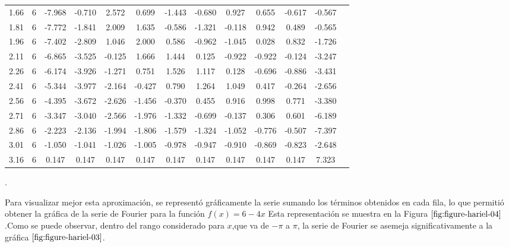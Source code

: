 {\begin{table}[H]
{\begin{tabular}{|c|cccccccccc|c|c|}
        1.66 & 6 & -7.968 & -0.710 & 2.572 & 0.699 & -1.443 & -0.680 & 0.927 & 0.655 & -0.617 & -0.567 \\ 
        1.81 & 6 & -7.772 & -1.841 & 2.009 & 1.635 & -0.586 & -1.321 & -0.118 & 0.942 & 0.489 & -0.565 \\ 
        1.96 & 6 & -7.402 & -2.809 & 1.046 & 2.000 & 0.586 & -0.962 & -1.045 & 0.028 & 0.832 & -1.726 \\
        2.11 & 6 & -6.865 & -3.525 & -0.125 & 1.666 & 1.444 & 0.125 & -0.922 & -0.922 & -0.124 & -3.247 \\
        2.26 & 6 & -6.174 & -3.926 & -1.271 & 0.751 & 1.526 & 1.117 & 0.128 & -0.696 & -0.886 & -3.431 \\ 
        2.41 & 6 & -5.344 & -3.977 & -2.164 & -0.427 & 0.790 & 1.264 & 1.049 & 0.417 & -0.264 & -2.656 \\
        2.56 & 6 & -4.395 & -3.672 & -2.626 & -1.456 & -0.370 & 0.455 & 0.916 & 0.998 & 0.771 & -3.380 \\
        2.71 & 6 & -3.347 & -3.040 & -2.566 & -1.976 & -1.332 & -0.699 & -0.137 & 0.306 & 0.601 & -6.189 \\
        2.86 & 6 & -2.223 & -2.136 & -1.994 & -1.806 & -1.579 & -1.324 & -1.052 & -0.776 & -0.507 & -7.397 \\
        3.01 & 6 & -1.050 & -1.041 & -1.026 & -1.005 & -0.978 & -0.947 & -0.910 & -0.869 & -0.823 & -2.648 \\
        3.16 & 6 & 0.147 & 0.147 & 0.147 & 0.147 & 0.147 & 0.147 & 0.147 & 0.147 & 0.147 & 7.323 \\
        \hline
    \end{tabular}
    }
    \label{tab:tabla-hariel-01}.
\end{table}

\begin{minipage}{\textwidth}
    Para visualizar mejor esta aproximación, se representó gráficamente la serie sumando los términos obtenidos en cada fila, lo que permitió obtener la gráfica de la serie de Fourier para la función \( f(x) = 6 - 4x \) Esta representación se muestra en la Figura \(\ref{fig:figure-hariel-04}\).Como se puede observar, dentro del rango considerado para \( x \),que va de \( -\pi \) a \( \pi \), la serie de Fourier se asemeja significativamente a la gráfica \(\ref{fig:figure-hariel-03}\).


\end{minipage}}
